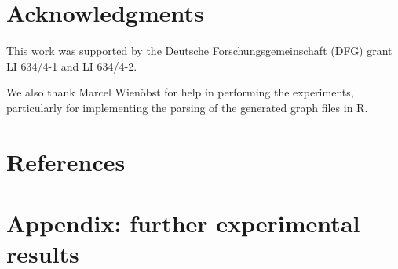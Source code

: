 %
%
%
%
%
%
%
%
%
%
%
%
%

%



\section{Acknowledgments}
This work was supported by the Deutsche Forschungsgemeinschaft (DFG) grant LI 634/4-1 and LI 634/4-2.

We also thank Marcel Wienöbst for help in performing the experiments, particularly for implementing the parsing of the generated graph files in R.

\section{References}



%



\section{Appendix: further experimental results}


